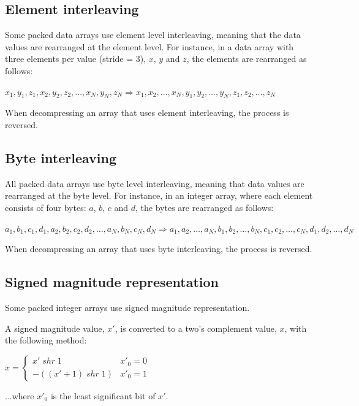 \subsection{Element interleaving}
Some packed data arrays use element level interleaving, meaning that the
data values are rearranged at the element level. For instance, in a data array
with three elements per value (stride = 3), $x$, $y$ and $z$, the elements are
rearranged as follows:

\begin{center}
$x_1,y_1,z_1,x_2,y_2,z_2,\ldots,x_N,y_N,z_N \Rightarrow 
x_1,x_2,\ldots,x_N,y_1,y_2,\ldots,y_N,z_1,z_2,\ldots,z_N$
\end{center}

When decompressing an array that uses element interleaving, the process is
reversed.

\subsection{Byte interleaving}
All packed data arrays use byte level interleaving, meaning that data values
are rearranged at the byte level. For instance, in an integer array, where each
element consists of four bytes: $a$, $b$, $c$ and $d$, the bytes are rearranged
as follows:

\begin{center}
$a_1,b_1,c_1,d_1,a_2,b_2,c_2,d_2,\ldots,a_N,b_N,c_N,d_N \Rightarrow 
a_1,a_2,\ldots,a_N,b_1,b_2,\ldots,b_N,c_1,c_2,\ldots,c_N,d_1,d_2,\ldots,d_N$
\end{center}

When decompressing an array that uses byte interleaving, the process is
reversed.

\subsection{Signed magnitude representation}
Some packed integer arrays use signed magnitude representation.

A signed magnitude value, $x'$, is converted to a two's complement value,
$x$, with the following method:

$x = \left\{\begin{array}{ll}
x'\; shr\; 1 & x'_0 = 0 \\
-((x'+1)\; shr\; 1) & x'_0 = 1
\end{array} \right.$

...where $x'_0$ is the least significant bit of $x'$.


